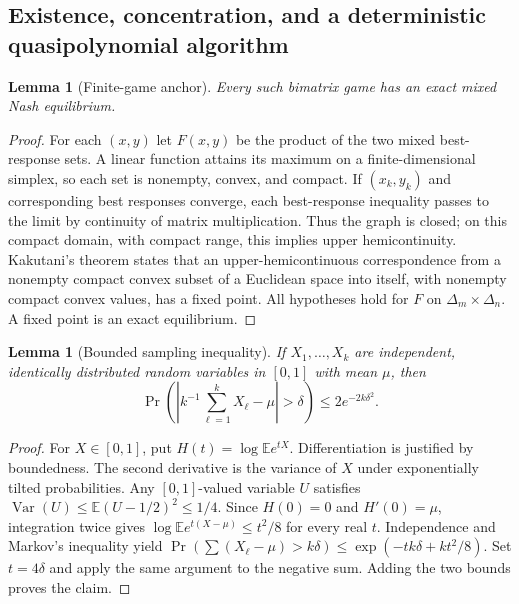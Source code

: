 \documentclass[11pt,a4paper]{article}
\newcommand{\E}{\mathbb E}
\newtheorem{lemma}[theorem]{Lemma}
\theoremstyle{definition}
\theoremstyle{remark}
\begin{document}
\subsection{Existence, concentration, and a deterministic quasipolynomial algorithm}
\begin{lemma}[Finite-game anchor]
Every such bimatrix game has an exact mixed Nash equilibrium.
\end{lemma}
\begin{proof}
For each $(x,y)$ let $F(x,y)$ be the product of the two mixed best-response sets. A linear function attains its maximum on a finite-dimensional simplex, so each set is nonempty, convex, and compact. If $(x_k,y_k)$ and corresponding best responses converge, each best-response inequality passes to the limit by continuity of matrix multiplication. Thus the graph is closed; on this compact domain, with compact range, this implies upper hemicontinuity. Kakutani's theorem states that an upper-hemicontinuous correspondence from a nonempty compact convex subset of a Euclidean space into itself, with nonempty compact convex values, has a fixed point. All hypotheses hold for $F$ on $\Delta_m\times\Delta_n$. A fixed point is an exact equilibrium.
\end{proof}

\begin{lemma}[Bounded sampling inequality]
If $X_1,\ldots,X_k$ are independent, identically distributed random variables in $[0,1]$ with mean $\mu$, then
\[
 \Pr\left(\left|k^{-1}\sum_{\ell=1}^kX_\ell-\mu\right|>\delta\right)
 \leq 2e^{-2k\delta^2}.
\]
\end{lemma}
\begin{proof}
For $X\in[0,1]$, put $H(t)=\log\E e^{tX}$. Differentiation is justified by boundedness. The second derivative is the variance of $X$ under exponentially tilted probabilities. Any $[0,1]$-valued variable $U$ satisfies $\operatorname{Var}(U)\leq\E(U-1/2)^2\leq1/4$. Since $H(0)=0$ and $H'(0)=\mu$, integration twice gives $\log\E e^{t(X-\mu)}\leq t^2/8$ for every real $t$. Independence and Markov's inequality yield
$\Pr(\sum(X_\ell-\mu)>k\delta)\leq\exp(-tk\delta+kt^2/8)$. Set $t=4\delta$ and apply the same argument to the negative sum. Adding the two bounds proves the claim.
\end{proof}
\end{document}
